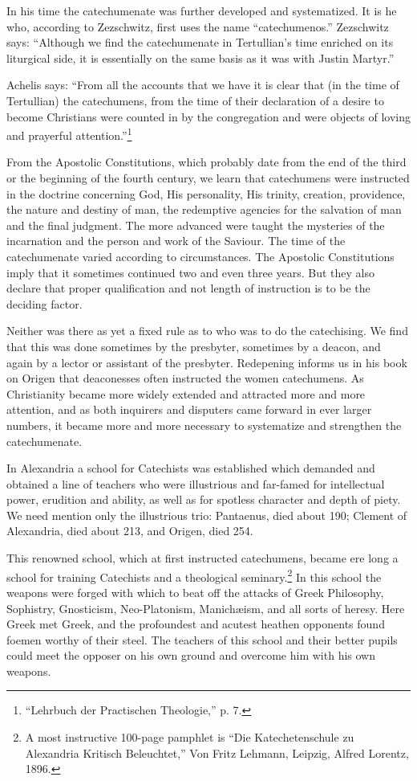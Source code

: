 In his time the catechumenate was further developed and systematized. It is he who, according to Zezschwitz, first uses the name “catechumenos.” Zezschwitz says: “Although we find the catechumenate in Tertullian’s time enriched on its liturgical side, it is essentially on the same basis as it was with Justin Martyr.”

Achelis says: “From all the accounts that we have it is clear that (in the time of Tertullian) the catechumens, from the time of their declaration of a desire to become Christians were counted in by the congregation and were objects of loving and prayerful attention.”\footnote{“Lehrbuch der Practischen Theologie,” p. 7.}

 From the Apostolic Constitutions, which probably date from the end of the third or the beginning of the fourth century, we learn that catechumens were instructed in the doctrine concerning God, His personality, His trinity, creation, providence, the nature and destiny of man, the redemptive agencies for the salvation of man and the final judgment. The more advanced were taught the mysteries of the incarnation and the person and work of the Saviour. The time of the catechumenate varied according to circumstances. The Apostolic Constitutions imply
that it sometimes continued two and even three years. But they also declare that proper qualification and not length of instruction is to be the deciding factor.

Neither was there as yet a fixed rule as to who was to do the catechising. We find that this was done sometimes by the presbyter, sometimes by a deacon, and again by a lector or assistant of the presbyter. Redepening informs us in his book on Origen that deaconesses often instructed the women catechumens. As Christianity became more widely extended and attracted more and more attention, and as both inquirers and disputers came forward in ever larger numbers, it became more and more necessary to systematize and strengthen the catechumenate.


 In Alexandria a school for Catechists was established which demanded and obtained a line of teachers who were illustrious and far-famed for intellectual power, erudition and ability, as well as for spotless character and depth of piety. We need mention only the illustrious trio: Pantaenus, died about 190; Clement of Alexandria, died about 213, and Origen, died 254.

This renowned school, which at first instructed catechumens, became ere long a school for training Catechists and a theological seminary.\footnote{A most instructive 100-page pamphlet is “Die Katechetenschule zu Alexandria Kritisch Beleuchtet,” Von Fritz Lehmann, Leipzig, Alfred Lorentz, 1896.} In this
school the weapons were forged with which to beat off the attacks of Greek Philosophy, Sophistry, Gnosticism, Neo-Platonism, Manichæism, and all sorts of heresy. Here Greek met Greek, and the profoundest and acutest heathen opponents found foemen worthy of their steel. The teachers of this school and their better pupils could meet the opposer on his own ground and overcome him with his own weapons.

